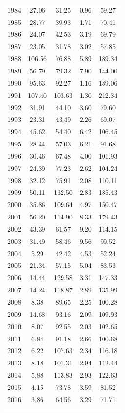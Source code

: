 \documentclass[12pt,]{article}
\begin{document}
\begin{longtable}{ccccc}
  1984 & 27.06 & 31.25 & 0.96 & 59.27 \\ 
  1985 & 28.77 & 39.93 & 1.71 & 70.41 \\ 
  1986 & 24.07 & 42.53 & 3.19 & 69.79 \\ 
  1987 & 23.05 & 31.78 & 3.02 & 57.85 \\ 
  1988 & 106.56 & 76.88 & 5.89 & 189.34 \\ 
  1989 & 56.79 & 79.32 & 7.90 & 144.00 \\ 
  1990 & 95.63 & 92.27 & 1.16 & 189.06 \\ 
  1991 & 107.40 & 103.63 & 1.30 & 212.34 \\ 
  1992 & 31.91 & 44.10 & 3.60 & 79.60 \\ 
  1993 & 23.31 & 43.49 & 2.26 & 69.07 \\ 
  1994 & 45.62 & 54.40 & 6.42 & 106.45 \\ 
  1995 & 28.44 & 57.03 & 6.21 & 91.68 \\ 
  1996 & 30.46 & 67.48 & 4.00 & 101.93 \\ 
  1997 & 24.39 & 77.23 & 2.62 & 104.24 \\ 
  1998 & 32.12 & 75.91 & 2.08 & 110.11 \\ 
  1999 & 50.11 & 132.50 & 2.83 & 185.43 \\ 
  2000 & 35.86 & 109.64 & 4.97 & 150.47 \\ 
  2001 & 56.20 & 114.90 & 8.33 & 179.43 \\ 
  2002 & 43.39 & 61.57 & 9.20 & 114.15 \\ 
  2003 & 31.49 & 58.46 & 9.56 & 99.52 \\ 
  2004 & 5.29 & 42.42 & 4.53 & 52.24 \\ 
  2005 & 21.34 & 57.15 & 5.04 & 83.53 \\ 
  2006 & 14.44 & 129.58 & 3.31 & 147.33 \\ 
  2007 & 14.24 & 118.87 & 2.89 & 135.99 \\ 
  2008 & 8.38 & 89.65 & 2.25 & 100.28 \\ 
  2009 & 14.68 & 93.16 & 2.09 & 109.93 \\ 
  2010 & 8.07 & 92.55 & 2.03 & 102.65 \\ 
  2011 & 6.84 & 91.18 & 2.66 & 100.68 \\ 
  2012 & 6.22 & 107.63 & 2.34 & 116.18 \\ 
  2013 & 8.18 & 101.31 & 2.94 & 112.44 \\ 
  2014 & 5.88 & 113.83 & 2.93 & 122.63 \\ 
  2015 & 4.15 & 73.78 & 3.59 & 81.52 \\ 
  2016 & 3.86 & 64.56 & 3.29 & 71.71 \\ 
   \hline
\hline
\label{tab:Rec_removal}
\end{longtable}
\end{document}
